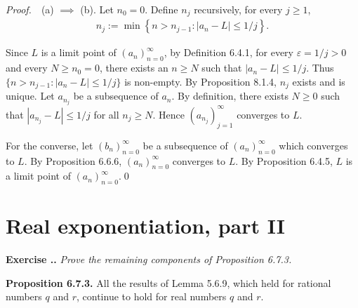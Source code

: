 \documentclass{book}
\newcommand{\pff}{\vspace{.25em}\noindent\emph{Proof.}~~}
\newcommand{\titl}[1]{\noindent\textbf{#1}}
\newcounter{Exercise}[section]
\renewcommand{\theExercise}{\thesection.\arabic{Exercise}.}
\newcommand{\new}{\vspace{1.5em}\noindent\textbf{{Exercise \stepcounter{Exercise}\textbf{\theExercise}}} }
\begin{document}
\pff (a) $\implies$ (b). Let $n_0=0$. Define $n_j$ recursively, for every $j\geq 1$,
    \begin{align*}
        n_j:=\min\left\{n>n_{j-1}:|a_n-L|\leq 1/j\right\}.
    \end{align*}

Since $L$ is a limit point of $(a_n)_{n=0}^{\infty}$, by Definition 6.4.1, for every $\varepsilon=1/j>0$ and every $N\geq n_0=0$, there exists an $n\geq N$ such that $|a_n-L|\leq 1/j$. Thus $\{n>n_{j-1}:|a_n-L|\leq 1/j\}$ is non-empty. By Proposition 8.1.4, $n_j$ exists and is unique. Let $a_{n_j}$ be a subsequence of $a_n$. By definition, there exists $N\geq 0$ such that $|a_{n_j}-L|\leq 1/j$ for all $n_j\geq N$. Hence $(a_{n_j})_{j=1}^{\infty}$ converges to $L$.

For the converse, let $(b_{n})_{n=0}^{\infty}$ be a subsequence of $(a_n)_{n=0}^{\infty}$ which converges to $L$. By Proposition 6.6.6, $(a_n)_{n=0}^{\infty}$ converges to $L$. By Proposition 6.4.5, $L$ is a limit point of $(a_n)_{n=0}^{\infty}$.\qed

\section{Real exponentiation, part II}

\new\emph{Prove the remaining components of Proposition 6.7.3.}

\begin{framed}
\titl{Proposition 6.7.3.} All the results of Lemma 5.6.9, which held for rational numbers $q$ and $r$, continue to hold for real numbers $q$ and $r$.
\end{framed}
\end{document}
